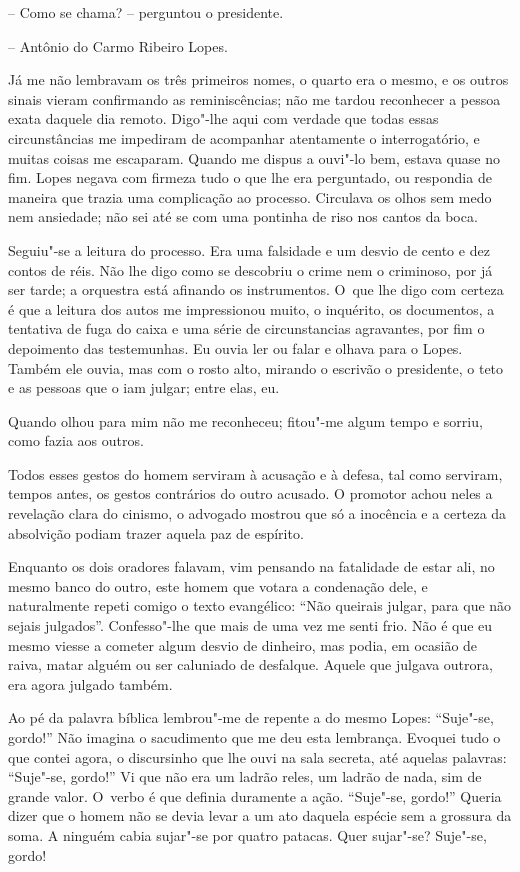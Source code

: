 -- Como se chama? -- perguntou o presidente.

-- Antônio do Carmo Ribeiro Lopes.

Já me não lembravam os três primeiros nomes, o quarto era o mesmo, e os
outros sinais vieram confirmando as reminiscências; não me tardou
reconhecer a pessoa exata daquele dia remoto. Digo"-lhe aqui com verdade
que todas essas circunstâncias me impediram de acompanhar atentamente o
interrogatório, e muitas coisas me escaparam. Quando me dispus a ouvi"-lo
bem, estava quase no fim. Lopes negava com firmeza tudo o que lhe era
perguntado, ou respondia de maneira que trazia uma complicação ao
processo. Circulava os olhos sem medo nem ansiedade; não sei até se com
uma pontinha de riso nos cantos da boca.

Seguiu"-se a leitura do processo. Era uma falsidade e um desvio de cento
e dez contos de réis. Não lhe digo como se descobriu o crime nem o
criminoso, por já ser tarde; a orquestra está afinando os instrumentos.
O~que lhe digo com certeza é que a leitura dos autos me impressionou
muito, o inquérito, os documentos, a tentativa de fuga do caixa e uma
série de circunstancias agravantes, por fim o depoimento das
testemunhas. Eu ouvia ler ou falar e olhava para o Lopes. Também ele
ouvia, mas com o rosto alto, mirando o escrivão o presidente, o teto e
as pessoas que o iam julgar; entre elas, eu.

Quando olhou para mim não me reconheceu; fitou"-me algum tempo e sorriu,
como fazia aos outros.

Todos esses gestos do homem serviram à acusação e à defesa, tal como
serviram, tempos antes, os gestos contrários do outro acusado. O
promotor achou neles a revelação clara do cinismo, o advogado mostrou
que só a inocência e a certeza da absolvição podiam trazer aquela paz de
espírito.

Enquanto os dois oradores falavam, vim pensando na fatalidade de estar
ali, no mesmo banco do outro, este homem que votara a condenação dele, e
naturalmente repeti comigo o texto evangélico: ``Não queirais julgar,
para que não sejais julgados''. Confesso"-lhe que mais de uma vez me
senti frio. Não é que eu mesmo viesse a cometer algum desvio de
dinheiro, mas podia, em ocasião de raiva, matar alguém ou ser caluniado
de desfalque. Aquele que julgava outrora, era agora julgado também.

Ao pé da palavra bíblica lembrou"-me de repente a do mesmo Lopes:
``Suje"-se, gordo!'' Não imagina o sacudimento que me deu esta lembrança.
Evoquei tudo o que contei agora, o discursinho que lhe ouvi na sala
secreta, até aquelas palavras: ``Suje"-se, gordo!'' Vi que não era um
ladrão reles, um ladrão de nada, sim de grande valor. O~verbo é que
definia duramente a ação. ``Suje"-se, gordo!'' Queria dizer que o homem
não se devia levar a um ato daquela espécie sem a grossura da soma. A
ninguém cabia sujar"-se por quatro patacas. Quer sujar"-se? Suje"-se,
gordo!


